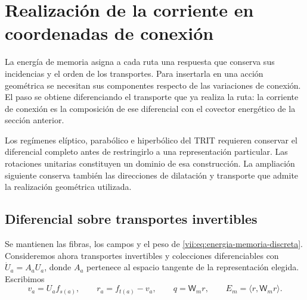
\section{Realización de la corriente en coordenadas de conexión}
\label{vii:sec:composicion-corriente-conexion}

La energía de memoria asigna a cada ruta una respuesta que conserva sus
incidencias y el orden de los transportes. Para insertarla en una acción
geométrica se necesitan sus componentes respecto de las variaciones de
conexión. El paso se obtiene diferenciando el transporte que ya realiza
la ruta: la corriente de conexión es la composición de ese diferencial
con el covector energético de la sección anterior.

Los regímenes elíptico, parabólico e hiperbólico del TRIT requieren
conservar el diferencial completo antes de restringirlo a una
representación particular. Las rotaciones unitarias constituyen un
dominio de esa construcción. La ampliación siguiente conserva también
las direcciones de dilatación y transporte que admite la realización
geométrica utilizada.

\subsection{Diferencial sobre transportes invertibles}

Se mantienen las fibras, los campos y el peso de
\eqref{vii:eq:energia-memoria-discreta}. Consideremos ahora transportes
invertibles y colecciones diferenciables con
\(\dot U_a=A_aU_a\), donde \(A_a\) pertenece al espacio tangente
de la representación elegida. Escribimos
\[
 v_a=U_af_{s(a)},\qquad r_a=f_{t(a)}-v_a,\qquad
 q=\mathsf W_mr,\qquad E_m=\langle r,\mathsf W_mr\rangle.
\]

